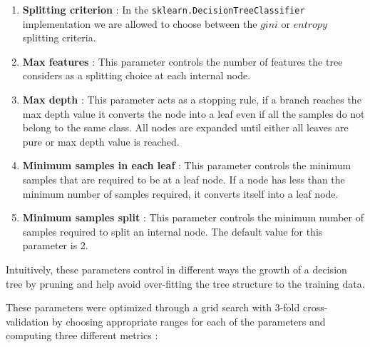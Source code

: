 \documentclass[final,3p,times,twocolumn]{elsarticle}
\begin{document}
\begin{enumerate}
\item{\textbf{Splitting criterion} : In the \texttt{sklearn.DecisionTreeClassifier} implementation we are allowed to choose between the $gini$ or $entropy$ splitting criteria.}
\item{\textbf{Max features} : This parameter controls the number of features the tree considers as a splitting choice at each internal node.}
\item{\textbf{Max depth} : This parameter acts as a stopping rule, if a branch reaches the max depth value it converts the node into a leaf even if all the samples do not belong to the same class. All nodes are expanded until either all leaves are pure or max depth value is reached.}
\item{\textbf{Minimum samples in each leaf} : This parameter controls the minimum samples that are required to be at a leaf node. If a node has less than the minimum number of samples required, it converts itself into a leaf node.}
\item{\textbf{Minimum samples split} : This parameter controls the minimum number of samples required to split an internal node. The default value for this parameter is 2.}
\end{enumerate}

Intuitively, these parameters control in different ways the growth of a decision tree by pruning and help avoid over-fitting the tree structure to the training data. 

These parameters were optimized through a grid search with 3-fold cross-validation by choosing appropriate ranges for each of the parameters and computing three different metrics :
\end{document}

